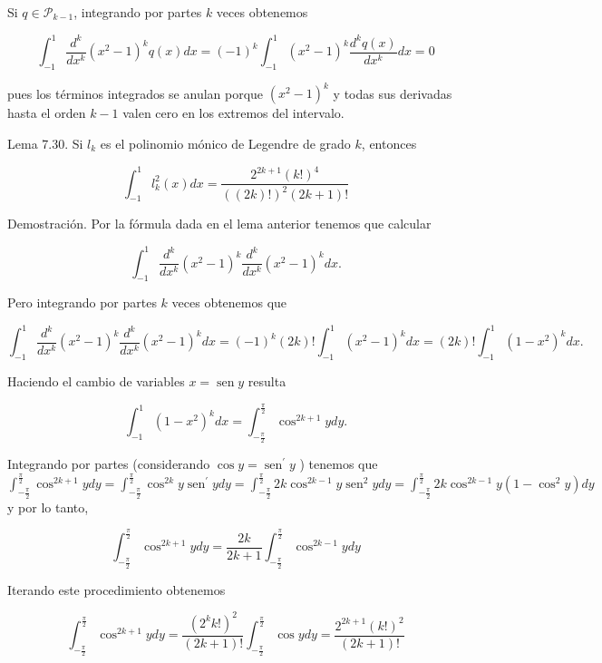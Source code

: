 \documentclass[10pt]{article}
\begin{document}
Si $q \in \mathcal{P}_{k-1}$, integrando por partes $k$ veces obtenemos

$$
\int_{-1}^{1} \frac{d^{k}}{d x^{k}}\left(x^{2}-1\right)^{k} q(x) d x=(-1)^{k} \int_{-1}^{1}\left(x^{2}-1\right)^{k} \frac{d^{k} q(x)}{d x^{k}} d x=0
$$

pues los términos integrados se anulan porque $\left(x^{2}-1\right)^{k}$ y todas sus derivadas hasta el orden $k-1$ valen cero en los extremos del intervalo.

Lema 7.30. Si $l_{k}$ es el polinomio mónico de Legendre de grado $k$, entonces

$$
\int_{-1}^{1} l_{k}^{2}(x) d x=\frac{2^{2 k+1}(k!)^{4}}{((2 k)!)^{2}(2 k+1)!}
$$

Demostración. Por la fórmula dada en el lema anterior tenemos que calcular

$$
\int_{-1}^{1} \frac{d^{k}}{d x^{k}}\left(x^{2}-1\right)^{k} \frac{d^{k}}{d x^{k}}\left(x^{2}-1\right)^{k} d x .
$$

Pero integrando por partes $k$ veces obtenemos que

$$
\int_{-1}^{1} \frac{d^{k}}{d x^{k}}\left(x^{2}-1\right)^{k} \frac{d^{k}}{d x^{k}}\left(x^{2}-1\right)^{k} d x=(-1)^{k}(2 k)!\int_{-1}^{1}\left(x^{2}-1\right)^{k} d x=(2 k)!\int_{-1}^{1}\left(1-x^{2}\right)^{k} d x .
$$

Haciendo el cambio de variables $x=\operatorname{sen} y$ resulta

$$
\int_{-1}^{1}\left(1-x^{2}\right)^{k} d x=\int_{-\frac{\pi}{2}}^{\frac{\pi}{2}} \cos ^{2 k+1} y d y .
$$

Integrando por partes (considerando $\cos y=\operatorname{sen}^{\prime} y$ ) tenemos que\\
$\int_{-\frac{\pi}{2}}^{\frac{\pi}{2}} \cos ^{2 k+1} y d y=\int_{-\frac{\pi}{2}}^{\frac{\pi}{2}} \cos ^{2 k} y \operatorname{sen}^{\prime} y d y=\int_{-\frac{\pi}{2}}^{\frac{\pi}{2}} 2 k \cos ^{2 k-1} y \operatorname{sen}^{2} y d y=\int_{-\frac{\pi}{2}}^{\frac{\pi}{2}} 2 k \cos ^{2 k-1} y\left(1-\cos ^{2} y\right) d y$\\
y por lo tanto,

$$
\int_{-\frac{\pi}{2}}^{\frac{\pi}{2}} \cos ^{2 k+1} y d y=\frac{2 k}{2 k+1} \int_{-\frac{\pi}{2}}^{\frac{\pi}{2}} \cos ^{2 k-1} y d y
$$

Iterando este procedimiento obtenemos

$$
\int_{-\frac{\pi}{2}}^{\frac{\pi}{2}} \cos ^{2 k+1} y d y=\frac{\left(2^{k} k!\right)^{2}}{(2 k+1)!} \int_{-\frac{\pi}{2}}^{\frac{\pi}{2}} \cos y d y=\frac{2^{2 k+1}(k!)^{2}}{(2 k+1)!}
$$
\end{document}
